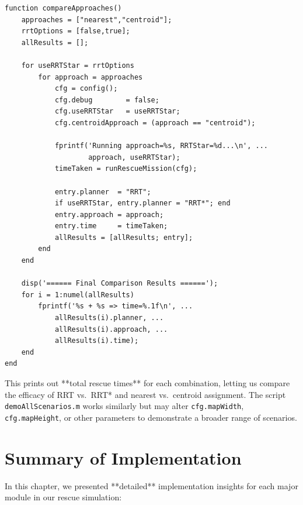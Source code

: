 \documentclass[12pt,a4paper]{report}
\begin{document}
\begin{verbatim}
function compareApproaches()
    approaches = ["nearest","centroid"];
    rrtOptions = [false,true];
    allResults = [];

    for useRRTStar = rrtOptions
        for approach = approaches
            cfg = config();
            cfg.debug        = false;
            cfg.useRRTStar   = useRRTStar;
            cfg.centroidApproach = (approach == "centroid");

            fprintf('Running approach=%s, RRTStar=%d...\n', ...
                    approach, useRRTStar);
            timeTaken = runRescueMission(cfg);

            entry.planner  = "RRT";
            if useRRTStar, entry.planner = "RRT*"; end
            entry.approach = approach;
            entry.time     = timeTaken;
            allResults = [allResults; entry];
        end
    end

    disp('====== Final Comparison Results ======');
    for i = 1:numel(allResults)
        fprintf('%s + %s => time=%.1f\n', ...
            allResults(i).planner, ...
            allResults(i).approach, ...
            allResults(i).time);
    end
end
\end{verbatim}
This prints out **total rescue times** for each combination, letting us compare the 
efficacy of RRT vs.\ RRT* and nearest vs.\ centroid assignment. The script 
\texttt{demoAllScenarios.m} works similarly but may alter \texttt{cfg.mapWidth}, 
\texttt{cfg.mapHeight}, or other parameters to demonstrate a broader range of scenarios.

\section{Summary of Implementation}
\label{sec:summary_implementation}

In this chapter, we presented **detailed** implementation insights for each major module 
in our rescue simulation:
\end{document}

